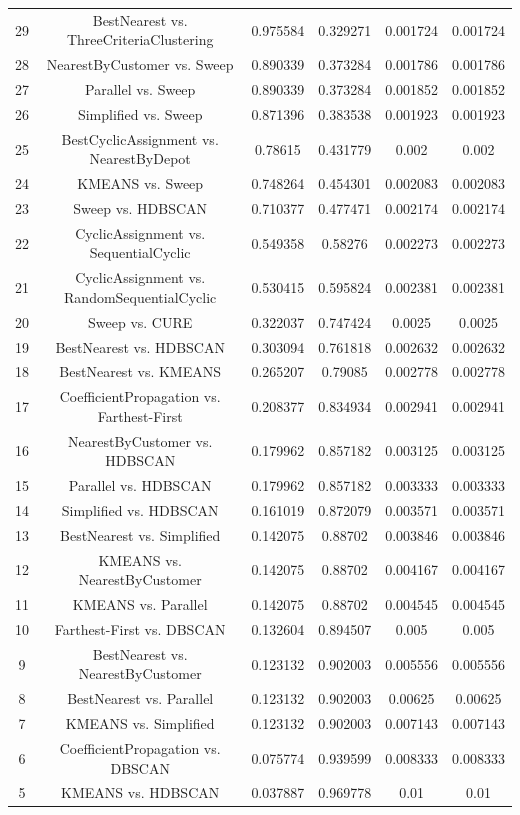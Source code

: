\documentclass[a4paper,10pt]{article}
\begin{document}
\begin{landscape}
\begin{table}[!htp]
\begin{tabular}{cccccc}
29&BestNearest vs. ThreeCriteriaClustering&0.975584&0.329271&0.001724&0.001724\\
28&NearestByCustomer vs. Sweep&0.890339&0.373284&0.001786&0.001786\\
27&Parallel vs. Sweep&0.890339&0.373284&0.001852&0.001852\\
26&Simplified vs. Sweep&0.871396&0.383538&0.001923&0.001923\\
25&BestCyclicAssignment vs. NearestByDepot&0.78615&0.431779&0.002&0.002\\
24&KMEANS vs. Sweep&0.748264&0.454301&0.002083&0.002083\\
23&Sweep vs. HDBSCAN&0.710377&0.477471&0.002174&0.002174\\
22&CyclicAssignment vs. SequentialCyclic&0.549358&0.58276&0.002273&0.002273\\
21&CyclicAssignment vs. RandomSequentialCyclic&0.530415&0.595824&0.002381&0.002381\\
20&Sweep vs. CURE&0.322037&0.747424&0.0025&0.0025\\
19&BestNearest vs. HDBSCAN&0.303094&0.761818&0.002632&0.002632\\
18&BestNearest vs. KMEANS&0.265207&0.79085&0.002778&0.002778\\
17&CoefficientPropagation vs. Farthest-First&0.208377&0.834934&0.002941&0.002941\\
16&NearestByCustomer vs. HDBSCAN&0.179962&0.857182&0.003125&0.003125\\
15&Parallel vs. HDBSCAN&0.179962&0.857182&0.003333&0.003333\\
14&Simplified vs. HDBSCAN&0.161019&0.872079&0.003571&0.003571\\
13&BestNearest vs. Simplified&0.142075&0.88702&0.003846&0.003846\\
12&KMEANS vs. NearestByCustomer&0.142075&0.88702&0.004167&0.004167\\
11&KMEANS vs. Parallel&0.142075&0.88702&0.004545&0.004545\\
10&Farthest-First vs. DBSCAN&0.132604&0.894507&0.005&0.005\\
9&BestNearest vs. NearestByCustomer&0.123132&0.902003&0.005556&0.005556\\
8&BestNearest vs. Parallel&0.123132&0.902003&0.00625&0.00625\\
7&KMEANS vs. Simplified&0.123132&0.902003&0.007143&0.007143\\
6&CoefficientPropagation vs. DBSCAN&0.075774&0.939599&0.008333&0.008333\\
5&KMEANS vs. HDBSCAN&0.037887&0.969778&0.01&0.01\\

\end{tabular}
\end{table}
\end{landscape}
\end{document}
